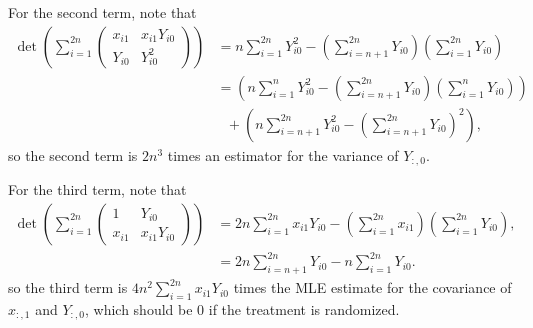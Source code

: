 \documentclass[letterpaper,11pt]{article}
\begin{document}
\begin{enumerate}
\begin{enumerate}
\begin{description}
\begin{description}
        For the second term, note that
        \begin{align}
          \det\left(\sum_{i=1}^{2n}
          \begin{pmatrix}
            x_{i1} & x_{i1}Y_{i0} \\
            Y_{i0} & Y_{i0}^2 \end{pmatrix}
                     \right)
                   &= n\sum_{i=1}^{2n}Y_{i0}^2 -
                     \left(\sum_{i=n+1}^{2n}Y_{i0}\right)\left(\sum_{i=1}^{2n}Y_{i0}\right)
          \label{eqn:p1_determinant_second_term}\\
                   &= \left(n\sum_{i=1}^{n}Y_{i0}^2 - \left(\sum_{i=n+1}^{2n}Y_{i0}\right)
                     \left(\sum_{i=1}^{n}Y_{i0}\right)\right)
          \nonumber\\
                   &~~~+ 
                     \left(n\sum_{i=n+1}^{2n}Y_{i0}^2 - \left(\sum_{i=n+1}^{2n}Y_{i0}\right)^2\right),
                     \nonumber
        \end{align}
        so the second term is $2n^3$ times an estimator for the variance of
        $Y_{:,0}$.

        For the third term, note that
        \begin{align}
          \det\left(
          \sum_{i=1}^{2n}
          \begin{pmatrix}
            1 & Y_{i0} \\
            x_{i1} & x_{i1}Y_{i0}
          \end{pmatrix}\right)
                   & = 2n\sum_{i=1}^{2n}x_{i1}Y_{i0} - \left(\sum_{i=1}^{2n}x_{i1}\right)
                     \left(\sum_{i=1}^{2n}Y_{i0}\right), \nonumber\\
              &= 2n\sum_{i=n+1}^{2n}Y_{i0} - n\sum_{i=1}^{2n}Y_{i0}.
                \label{eqn:p1_determinant_third_term}
        \end{align}
        so the third term is $4n^2\sum_{i=1}^{2n}x_{i1}Y_{i0}$ times the MLE
        estimate for the covariance of $x_{:,1}$ and $Y_{:,0}$, which should be
        $0$ if the treatment is randomized.


\end{description}
\end{description}
\end{enumerate}
\end{enumerate}
\end{document}
